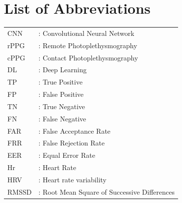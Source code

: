 \chapter*{List of Abbreviations}\label{LstAbb}
\begin{flushleft}
\begin{longtable}{lp{8.7cm}}


CNN&	: Convolutional Neural Network\\
rPPG&	: Remote Photoplethysmography \\     
cPPG&   : Contact Photoplethysmography\\
DL&     : Deep Learning\\
TP&     : True Positive\\
FP&     : False Positive\\
TN&     : True Negative\\
FN&     : False Negative\\
FAR&    : False Acceptance Rate\\
FRR&    : False Rejection Rate\\
EER&    : Equal Error Rate\\
Hr&     : Heart Rate\\
HRV&    : Heart rate variability\\
RMSSD&  : Root Mean Square of Successive Differences\\



\end{longtable}
\end{flushleft}
